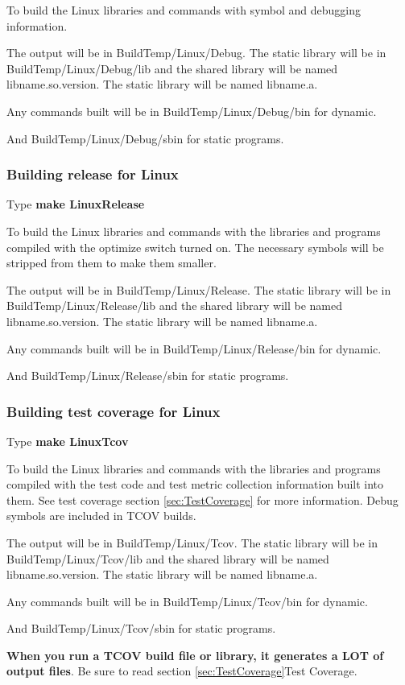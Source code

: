 To build the Linux libraries and commands with symbol
and debugging information.
  
The output will be in BuildTemp/Linux/Debug.
The static library will be in BuildTemp/Linux/Debug/lib
and the shared library will be named lib{name}.so.{version}.
The static library will be named lib{name}.a.
  
Any commands built will be in BuildTemp/Linux/Debug/bin
for dynamic.

And BuildTemp/Linux/Debug/sbin for static programs.

\subsubsection{Building release for Linux}
Type \textbf{make LinuxRelease}

To build the Linux libraries and commands with the libraries
and programs compiled with the optimize switch turned on.
The necessary symbols will be stripped from them to make
them smaller.

The output will be in BuildTemp/Linux/Release.
The static library will be in BuildTemp/Linux/Release/lib
and the shared library will be named lib{name}.so.{version}.
The static library will be named lib{name}.a.
  
Any commands built will be in BuildTemp/Linux/Release/bin
for dynamic.

And BuildTemp/Linux/Release/sbin for static programs.

\subsubsection{Building test coverage for Linux}
Type \textbf{make LinuxTcov}

To build the Linux libraries and commands with the libraries
and programs compiled with the test code and test metric
collection information built into them.
See test coverage section \ref{sec:TestCoverage} for more information.
Debug symbols are included in TCOV builds.

The output will be in BuildTemp/Linux/Tcov.
The static library will be in BuildTemp/Linux/Tcov/lib
and the shared library will be named lib{name}.so.{version}.
The static library will be named lib{name}.a.

Any commands built will be in BuildTemp/Linux/Tcov/bin
for dynamic.

And BuildTemp/Linux/Tcov/sbin for static programs.

\textbf{When you run a TCOV build file or library, it generates a LOT of  output files}. Be sure to read section \ref{sec:TestCoverage}{Test Coverage}.
  
